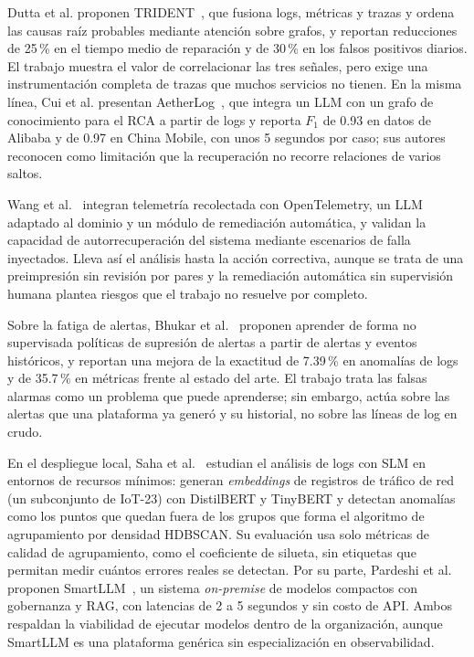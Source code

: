 Dutta et al. proponen TRIDENT~\cite{dutta2025_trident}, que fusiona logs, métricas y trazas y ordena las causas raíz probables mediante atención sobre grafos, y reportan reducciones de 25\,\% en el tiempo medio de reparación y de 30\,\% en los falsos positivos diarios. El trabajo muestra el valor de correlacionar las tres señales, pero exige una instrumentación completa de trazas que muchos servicios no tienen. En la misma línea, Cui et al. presentan AetherLog~\cite{cui2025_aetherlog}, que integra un LLM con un grafo de conocimiento para el RCA a partir de logs y reporta $F_1$ de 0.93 en datos de Alibaba y de 0.97 en China Mobile, con unos 5 segundos por caso; sus autores reconocen como limitación que la recuperación no recorre relaciones de varios saltos.

Wang et al.~\cite{wang2025_cloudnative_rca} integran telemetría recolectada con OpenTelemetry, un LLM adaptado al dominio y un módulo de remediación automática, y validan la capacidad de autorrecuperación del sistema mediante escenarios de falla inyectados. Lleva así el análisis hasta la acción correctiva, aunque se trata de una preimpresión sin revisión por pares y la remediación automática sin supervisión humana plantea riesgos que el trabajo no resuelve por completo.

Sobre la fatiga de alertas, Bhukar et al.~\cite{bhukar2024_alertsuppression} proponen aprender de forma no supervisada políticas de supresión de alertas a partir de alertas y eventos históricos, y reportan una mejora de la exactitud de 7.39\,\% en anomalías de logs y de 35.7\,\% en métricas frente al estado del arte. El trabajo trata las falsas alarmas como un problema que puede aprenderse; sin embargo, actúa sobre las alertas que una plataforma ya generó y su historial, no sobre las líneas de log en crudo.

En el despliegue local, Saha et al.~\cite{saha2025_slm_minimal} estudian el análisis de logs con SLM en entornos de recursos mínimos: generan \textit{embeddings} de registros de tráfico de red (un subconjunto de IoT-23) con DistilBERT y TinyBERT y detectan anomalías como los puntos que quedan fuera de los grupos que forma el algoritmo de agrupamiento por densidad HDBSCAN. Su evaluación usa solo métricas de calidad de agrupamiento, como el coeficiente de silueta, sin etiquetas que permitan medir cuántos errores reales se detectan. Por su parte, Pardeshi et al. proponen SmartLLM~\cite{pardeshi2026_smartllm}, un sistema \textit{on-premise} de modelos compactos con gobernanza y RAG, con latencias de 2 a 5 segundos y sin costo de API. Ambos respaldan la viabilidad de ejecutar modelos dentro de la organización, aunque SmartLLM es una plataforma genérica sin especialización en observabilidad.

